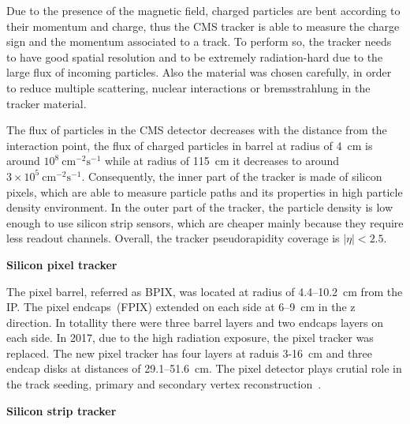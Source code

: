 Due to the presence of the magnetic field, charged particles are bent according to their momentum and charge, thus the CMS tracker is able to measure the charge sign and the momentum associated to a track. To perform so, the tracker needs to have good spatial resolution and to be extremely radiation-hard due to the large flux of incoming particles. Also the material was chosen carefully, in order to reduce multiple scattering, nuclear interactions or bremsstrahlung in the tracker material.

The flux of particles in the CMS detector decreases with the distance from the interaction point, the flux of charged particles in barrel at radius of 4~cm is around $10^{8}~\mathrm{cm^{-2}s^{-1}}$ while at radius of 115~cm it decreases to around $3 \times10^{5}~\mathrm{cm^{-2}s^{-1}}$. Consequently, the inner part of the tracker is made of silicon pixels, which are able to measure particle paths and its properties in high particle density environment. In the outer part of the tracker, the particle density is low enough to use silicon strip sensors, which are cheaper mainly because they require less readout channels. Overall, the tracker pseudorapidity coverage is  $|\eta| < 2.5$.


\textbf{Silicon pixel tracker}

The pixel barrel, referred as BPIX,  was located at radius of 4.4--10.2~cm from the IP. The pixel endcaps~(FPIX) extended on each side at 6--9~cm in the z direction. In totallity there were three barrel layers and two endcaps layers on each side. In 2017, due to the high radiation exposure, the pixel tracker was replaced. The new pixel tracker has four layers at raduis 3-16~cm and three endcap disks at distances of 29.1--51.6~cm. The pixel detector plays crutial role in the track seeding, primary and secondary vertex reconstruction~\cite{CMS:2012sda}. 



\textbf{Silicon strip tracker}



